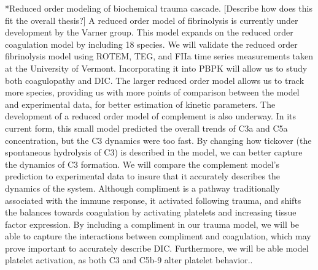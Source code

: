 \documentclass[12pt]{article}
\makeatletter
\renewcommand\paragraph{\@startsection
  {paragraph}{2}{0mm}
  {-0.05in}
  {-0.5\baselineskip}
  {\normalfont\normalsize\itshape}}
\makeatother
\begin{document}
\paragraph*{Reduced order modeling of biochemical trauma cascade.}
[Describe how does this fit the overall thesis?]
A reduced order model of fibrinolysis is currently under development by the Varner group. This model expands on the reduced order coagulation model by including 18 species. We will validate the reduced order fibrinolysis model using ROTEM, TEG, and FIIa time series measurements taken at the University of Vermont. Incorporating it into PBPK will allow us to study both coagulopathy and DIC. The larger reduced order model allows us to track more species, providing us with more points of comparison between the model and experimental data, for better estimation of kinetic parameters. The development of a reduced order model of complement is also underway. In its current form, this small model predicted the overall trends of C3a and C5a concentration, but the C3 dynamics were too fast. By changing how tickover (the spontaneous hydrolysis of C3) is described in the model, we can better capture the dynamics of C3 formation.  We will compare the complement model's prediction to experimental data to insure that it accurately describes the dynamics of the system.\cite{morad2015time} Although compliment is a pathway traditionally associated with the immune response, it activated following trauma, and shifts the balances towards coagulation by activating platelets and increasing tissue factor expression. \cite{markiewski2007complement} By including a compliment in our trauma model, we will be able to capture the interactions between compliment and coagulation, which may prove important to accurately describe DIC. Furthermore, we will be able model platelet activation, as both C3 and C5b-9 alter platelet behavior.\cite{peerschke2008platelet}.
\end{document}
